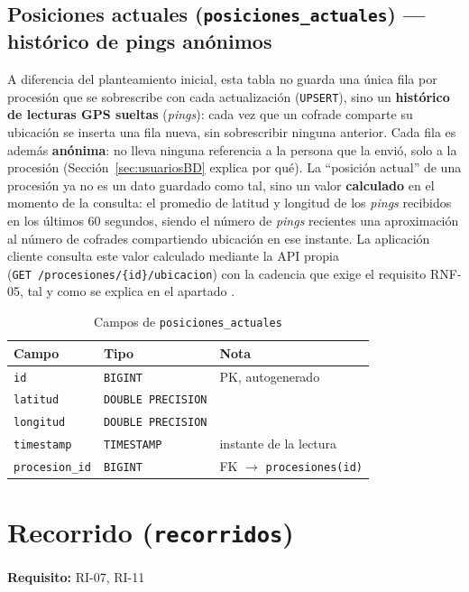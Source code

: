 \subsection{Posiciones actuales (\texttt{posiciones\_actuales}) --- histórico de pings anónimos}
A diferencia del planteamiento inicial, esta tabla no guarda una única fila por procesión que se sobrescribe con cada actualización (\texttt{UPSERT}), sino un \textbf{histórico de lecturas GPS sueltas} (\emph{pings}): cada vez que un cofrade comparte su ubicación se inserta una fila nueva, sin sobrescribir ninguna anterior. Cada fila es además \textbf{anónima}: no lleva ninguna referencia a la persona que la envió, solo a la procesión (Sección~\ref{sec:usuariosBD} explica por qué). La ``posición actual'' de una procesión ya no es un dato guardado como tal, sino un valor \textbf{calculado} en el momento de la consulta: el promedio de latitud y longitud de los \emph{pings} recibidos en los últimos 60 segundos, siendo el número de \emph{pings} recientes una aproximación al número de cofrades compartiendo ubicación en ese instante. La aplicación cliente consulta este valor calculado mediante la API propia (\texttt{GET~/procesiones/\{id\}/ubicacion}) con la cadencia que exige el requisito RNF-05, tal y como se explica en el apartado .

\begin{table}[H]
\centering
\begin{tabular}{|l|l|p{7cm}|}
\hline
\textbf{Campo} & \textbf{Tipo} & \textbf{Nota} \\
\hline
\texttt{id} & \texttt{BIGINT} & PK, autogenerado \\
\hline
\texttt{latitud} & \texttt{DOUBLE PRECISION} &  \\
\hline
\texttt{longitud} & \texttt{DOUBLE PRECISION} &  \\
\hline
\texttt{timestamp} & \texttt{TIMESTAMP} & instante de la lectura \\
\hline
\texttt{procesion\_id} & \texttt{BIGINT} & FK $\to$ \texttt{procesiones(id)} \\
\hline
\end{tabular}
\caption{Campos de \texttt{posiciones\_actuales}}
\end{table}

\section{Recorrido (\texttt{recorridos})}
\textbf{Requisito:} RI-07, RI-11

